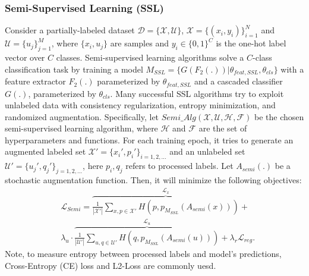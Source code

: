\documentclass[letterpaper]{article} \usepackage{aaai22}  \usepackage{times}  \usepackage{helvet}  \usepackage{courier}  \usepackage[hyphens]{url}  \usepackage{graphicx} \usepackage{subfigure}
\begin{document}
\subsubsection{Semi-Supervised Learning (SSL)}
Consider a partially-labeled dataset $\mathcal{D}=\{\mathcal{X}, \mathcal{U}\}$, $\mathcal{X}=\{(x_i,y_i)\}_{i=1}^{N}$ and $\mathcal{U}=\{u_j\}_{j=1}^{M}$, where $\{x_i,u_j\}$ are samples and $y_i \in \{0,1\}^C$ is the one-hot label vector over $C$ classes. Semi-supervised learning algorithms solve a $C$-class classification task by training a model $M_{SSL}=\{G(F_2(.))|\theta_{feat,SSL}, \theta_{cls}\}$ with a feature extractor $F_2(.)$ parameterized by $\theta_{feat,SSL}$ and a cascaded classifier $G(.)$, parameterized by $\theta_{cls}$. Many successful SSL algorithms try to exploit unlabeled data with consistency regularization, entropy minimization, and randomized augmentation. Specifically, let $Semi\_Alg(\mathcal{X}, \mathcal{U}, \mathcal{H}, \mathcal{F})$ be the chosen semi-supervised learning algorithm, where $\mathcal{H}$ and $\mathcal{F}$ are the set of hyperparameters and functions. For each training epoch, it tries to generate an augmented labeled set $\mathcal{X'}=\{x_i',p_i'\}_{i=1,2,...}$ and an unlabeled set $\mathcal{U'}=\{u_j', q_j'\}_{j=1,2,...}$, here $p_i, q_j$ refers to processed labels. Let $A_{semi}(.)$ be a stochastic augmentation function. Then, it will minimize the following objectives:
\begin{equation}
\begin{aligned}
    &\mathcal{L}_{Semi} = \overbrace{\frac{1}{|\mathcal{X}'|}\sum_{x,p \in \mathcal{X}'}H(p, p_{M_{SSL}}(A_{semi}(x)))}^{\mathcal{L}_x}
    + \\ &\lambda_u\cdot\overbrace{\frac{1}{|\mathcal{U}'|}\sum_{u,q \in \mathcal{U}'}H(q, p_{M_{SSL}}(A_{semi}(u)))}^{\mathcal{L}_u} + \lambda_{r}\mathcal{L}_{reg}.   
\end{aligned}
\end{equation}
Note, to measure entropy between processed labels and model's predictions, Cross-Entropy (CE) loss and L2-Loss are commonly uesd. 
\end{document}
